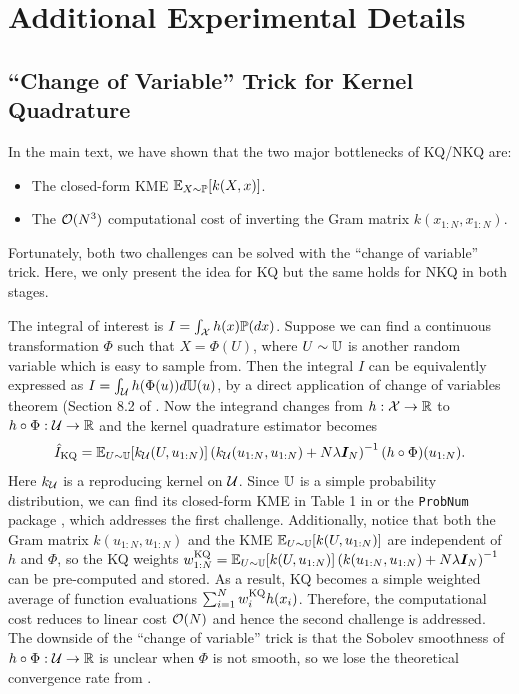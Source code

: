 \section{Additional Experimental Details}
\subsection{``Change of Variable'' Trick for Kernel Quadrature}\label{sec:reparam}
In the main text, we have shown that the two major bottlenecks of KQ/NKQ are: 
\begin{itemize}
    \item The closed-form KME $\operatorname{\mathbb{E}}_{X \sim \mathbb{P}}[k(X, x)]$. 
    \item The $\mathcal{O}(N^3)$ computational cost of inverting the Gram matrix $k(x_{1:N}, x_{1:N})$.
\end{itemize}
Fortunately, both two challenges can be solved with the ``change of variable'' trick. Here, we only present the idea for KQ but the same holds for NKQ in both stages. 

The integral of interest is $I = \int_{\mathcal{X}} h(x) \mathbb{P}(dx)$. 
Suppose we can find a continuous transformation $\Phi$ such that $X = \Phi(U)$, where $U \sim \mathbb{U}$ is another random variable which is easy to sample from. 
Then the integral $I$ can be equivalently expressed as $I = \int_{\mathcal{U}} h(\Phi(u)) d\mathbb{U}(u)$, by a direct application of change of variables theorem (Section 8.2 of \cite{stirzaker2003elementary}. 
Now the integrand changes from $h: \mathcal{X} \to \mathbb{R}$ to $h \circ \Phi: \mathcal{U} \to \mathbb{R}$ and the kernel quadrature estimator becomes
\begin{align*}
    \hat{I}_{\text{KQ}} = \operatorname{\mathbb{E}}_{U \sim \mathbb{U}} [k_{\mathcal{U}}(U, u_{1:N})] \left( k_{\mathcal{U}}(u_{1:N}, u_{1:N}) + N \lambda \boldsymbol{I}_N \right)^{-1} (h \circ \Phi)(u_{1:N}) .
\end{align*}
Here $k_{\mathcal{U}}$ is a reproducing kernel on $\mathcal{U}$.
Since $\mathbb{U}$ is a simple probability distribution, we can find its closed-form KME in Table 1 in \citet{Briol2019PI} or the \texttt{ProbNum} package \citep{Wenger2021}, which addresses the first challenge.
Additionally, notice that both the Gram matrix $k(u_{1:N}, u_{1:N})$ and the KME $\operatorname{\mathbb{E}}_{U \sim \mathbb{U}} [k(U, u_{1:N})]$ are independent of $h$ and $\Phi$, so the KQ weights $w_{1:N}^{\text{KQ}} = \operatorname{\mathbb{E}}_{U \sim \mathbb{U}} [k(U, u_{1:N})] \left( k(u_{1:N}, u_{1:N}) + N \lambda \boldsymbol{I}_N \right)^{-1}$ can be pre-computed and stored. 
As a result, KQ becomes a simple weighted average of function evaluations $\sum_{i=1}^N w_i^{\text{KQ}} h(x_i)$. Therefore, the computational cost reduces to linear cost $\mathcal{O}(N)$ and hence the second challenge is addressed. 
The downside of the ``change of variable'' trick is that the Sobolev smoothness of $h \circ \Phi: \mathcal{U} \to \mathbb{R}$ is unclear when $\Phi$ is not smooth, so we lose the theoretical convergence rate from .


